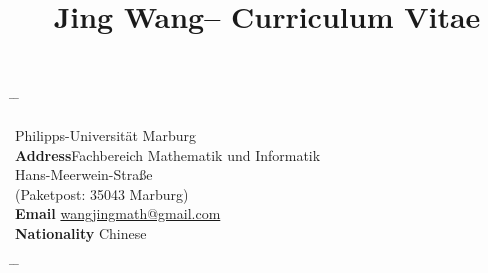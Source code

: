 \documentclass[10pt]{article} %
\begin{document}

\title{Jing Wang-- Curriculum Vitae} %


\parbox{0.9\textwidth}{ %
\begin{tabbing} %
\hspace{2cm} \= \hspace{1cm} \= \kill %

\> Philipps-Universität Marburg \\ %
{\bf Address}\>Fachbereich Mathematik und Informatik\\ %
\>Hans-Meerwein-Straße \\ %
\>(Paketpost: 35043 Marburg) \\ %
{\bf Email} \> \href{mailto:wangjingmath@gmail.com}{wangjingmath@gmail.com}\\ %
{\bf Nationality} \> Chinese\\ %
\end{tabbing}}
\hfill %
\parbox{0.5\textwidth}{ %
\begin{tabbing} %
\hspace{2cm} \= \hspace{1cm} \= \kill %
{\bf} \>  \\ %
\end{tabbing}}



\end{document}
